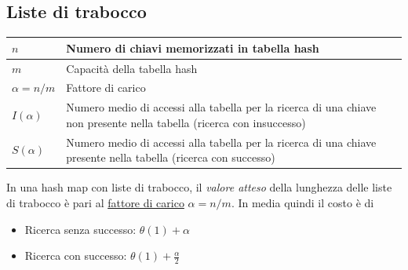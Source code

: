 \subsection{Liste di trabocco}
\vskip3mm
\begin{tabularx}{\textwidth}{lX}
	\toprule
	$n$             & Numero di chiavi memorizzati in tabella hash                                                                          \\
	\midrule
	$m$             & Capacità della tabella hash                                                                                           \\
	\midrule
	$\alpha=n / m $ & Fattore di carico                                                                                                     \\
	\midrule
	$I(\alpha)    $ & Numero medio di accessi alla tabella per la ricerca di una chiave non presente nella tabella (ricerca con insuccesso) \\
	\midrule
	$S(\alpha)    $ & Numero medio di accessi alla tabella per la ricerca di
	una chiave presente nella tabella (ricerca con successo)                                                                                \\
	\bottomrule
\end{tabularx}
\vskip3mm
In una hash map con liste di trabocco, il \textit{valore atteso} della lunghezza delle liste di trabocco è pari al \underline{fattore di carico} $ \alpha  = n / m $. In media quindi il costo è di
\begin{itemize}
	\item Ricerca senza successo: $ \theta \left(1\right) + \alpha  $
	\item Ricerca con successo: $ \theta \left(1\right) + \frac{\alpha}{2}  $
\end{itemize}
